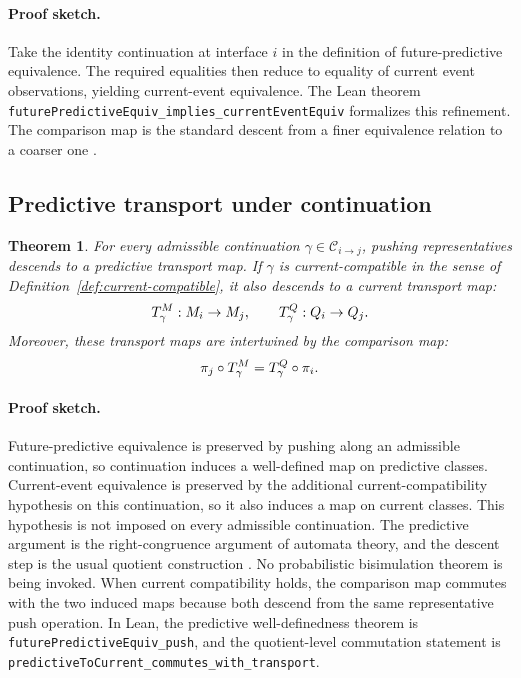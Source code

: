 \documentclass[11pt]{article}
\newtheorem{theorem}{Theorem}[section]
\theoremstyle{definition}
\begin{document}
\paragraph{Proof sketch.}
Take the identity continuation at interface $i$ in the definition of future-predictive equivalence. The required equalities then reduce to equality of current event observations, yielding current-event equivalence. The Lean theorem \nolinkurl{futurePredictiveEquiv_implies_currentEventEquiv} formalizes this refinement. The comparison map is the standard descent from a finer equivalence relation to a coarser one \citep{BurrisSankappanavar1981CourseUniversalAlgebra}.

\subsection{Predictive transport under continuation}\label{subsec:thm-transport}
\begin{theorem}\label{thm:predictive-transport}
For every admissible continuation $\gamma\in\mathcal{C}_{i\to j}$, pushing representatives descends to a predictive transport map. If $\gamma$ is current-compatible in the sense of Definition~\ref{def:current-compatible}, it also descends to a current transport map:
\[
T^{M}_{\gamma} : M_i \to M_j,
\qquad
T^{Q}_{\gamma} : Q_i \to Q_j.
\]
Moreover, these transport maps are intertwined by the comparison map:
\[
\pi_j \circ T^{M}_{\gamma}
=
T^{Q}_{\gamma} \circ \pi_i.
\]
\end{theorem}

\paragraph{Proof sketch.}
Future-predictive equivalence is preserved by pushing along an admissible continuation, so continuation induces a well-defined map on predictive classes. Current-event equivalence is preserved by the additional current-compatibility hypothesis on this continuation, so it also induces a map on current classes. This hypothesis is not imposed on every admissible continuation. The predictive argument is the right-congruence argument of automata theory, and the descent step is the usual quotient construction \citep{Nerode1958LinearAutomatonTransformations,BurrisSankappanavar1981CourseUniversalAlgebra}. No probabilistic bisimulation theorem is being invoked. When current compatibility holds, the comparison map commutes with the two induced maps because both descend from the same representative push operation. In Lean, the predictive well-definedness theorem is \nolinkurl{futurePredictiveEquiv_push}, and the quotient-level commutation statement is \nolinkurl{predictiveToCurrent_commutes_with_transport}.
\end{document}
